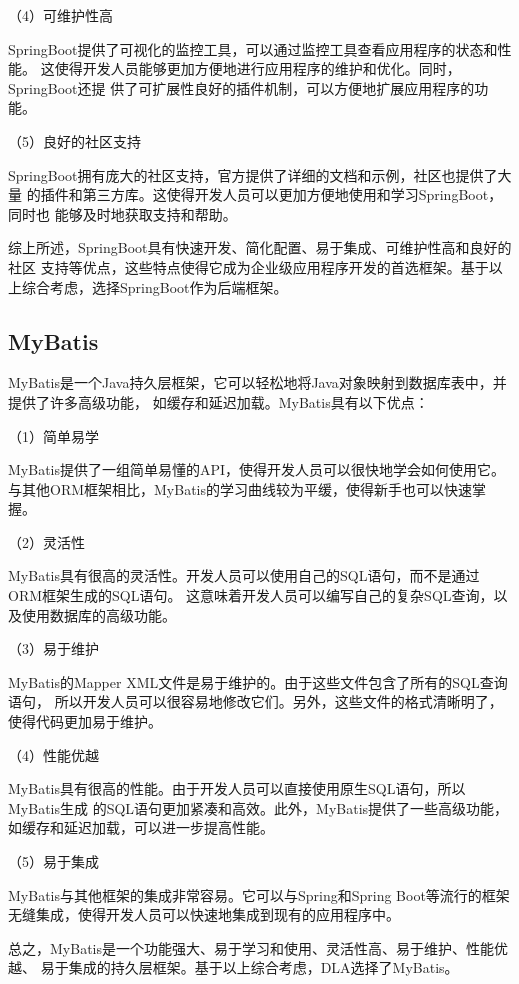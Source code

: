 （4）可维护性高

SpringBoot提供了可视化的监控工具，可以通过监控工具查看应用程序的状态和性能。
这使得开发人员能够更加方便地进行应用程序的维护和优化。同时，SpringBoot还提
供了可扩展性良好的插件机制，可以方便地扩展应用程序的功能。

（5）良好的社区支持

SpringBoot拥有庞大的社区支持，官方提供了详细的文档和示例，社区也提供了大量
的插件和第三方库。这使得开发人员可以更加方便地使用和学习SpringBoot，同时也
能够及时地获取支持和帮助。

综上所述，SpringBoot具有快速开发、简化配置、易于集成、可维护性高和良好的社区
支持等优点，这些特点使得它成为企业级应用程序开发的首选框架。基于以上综合考虑，选择SpringBoot作为后端框架。

\subsection{MyBatis}

MyBatis是一个Java持久层框架，它可以轻松地将Java对象映射到数据库表中，并提供了许多高级功能，
如缓存和延迟加载\cite{21,22}。MyBatis具有以下优点：

（1）简单易学

MyBatis提供了一组简单易懂的API，使得开发人员可以很快地学会如何使用它。
与其他ORM框架相比，MyBatis的学习曲线较为平缓，使得新手也可以快速掌握。

（2）灵活性

MyBatis具有很高的灵活性。开发人员可以使用自己的SQL语句，而不是通过ORM框架生成的SQL语句。
这意味着开发人员可以编写自己的复杂SQL查询，以及使用数据库的高级功能。

（3）易于维护

MyBatis的Mapper XML文件是易于维护的。由于这些文件包含了所有的SQL查询语句，
所以开发人员可以很容易地修改它们。另外，这些文件的格式清晰明了，使得代码更加易于维护。

（4）性能优越

MyBatis具有很高的性能。由于开发人员可以直接使用原生SQL语句，所以MyBatis生成
的SQL语句更加紧凑和高效。此外，MyBatis提供了一些高级功能，如缓存和延迟加载，可以进一步提高性能。

（5）易于集成

MyBatis与其他框架的集成非常容易。它可以与Spring和Spring Boot等流行的框架无缝集成，使得开发人员可以快速地集成到现有的应用程序中。

总之，MyBatis是一个功能强大、易于学习和使用、灵活性高、易于维护、性能优越、
易于集成的持久层框架。基于以上综合考虑，DLA选择了MyBatis。


